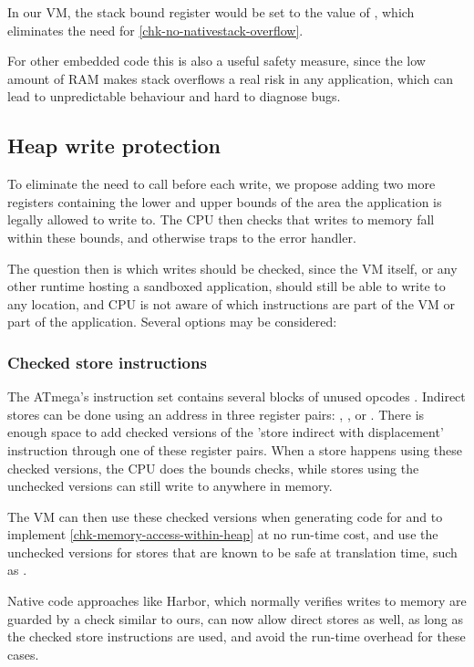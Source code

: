 In our VM, the stack bound register would be set to the value of , which eliminates the need for \ref{chk-no-nativestack-overflow}.

For other embedded code this is also a useful safety measure, since the low amount of RAM makes stack overflows a real risk in any application, which can lead to unpredictable behaviour and hard to diagnose bugs.

\subsection{Heap write protection}
To eliminate the need to call  before each write, we propose adding two more registers containing the lower and upper bounds of the area the application is legally allowed to write to. The CPU then checks that writes to memory fall within these bounds, and otherwise traps to the error handler.

The question then is which writes should be checked, since the VM itself, or any other runtime hosting a sandboxed application, should still be able to write to any location, and CPU is not aware of which instructions are part of the VM or part of the application. Several options may be considered:

\subsubsection{Checked store instructions}
The ATmega's instruction set contains several blocks of unused opcodes \cite{Atmel:AVRInstructionSetManual}. Indirect stores can be done using an address in three register pairs: , , or . There is enough space to add checked versions of the 'store indirect with displacement' instruction through one of these register pairs. When a store happens using these checked versions, the CPU does the bounds checks, while stores using the unchecked versions can still write to anywhere in memory.

The VM can then use these checked versions when generating code for  and  to implement \ref{chk-memory-access-within-heap} at no run-time cost, and use the unchecked versions for stores that are known to be safe at translation time, such as .

Native code approaches like Harbor, which normally verifies writes to memory are guarded by a check similar to ours, can now allow direct stores as well, as long as the checked store instructions are used, and avoid the run-time overhead for these cases.

